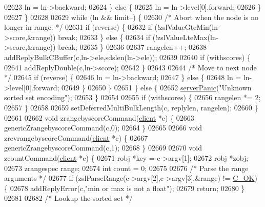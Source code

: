 \begin{DoxyCode}
02623                 ln = ln->backward;
02624             \} \textcolor{keywordflow}{else} \{
02625                 ln = ln->level[0].forward;
02626             \}
02627         \}
02628 
02629         \textcolor{keywordflow}{while} (ln && limit--) \{
02630             \textcolor{comment}{/* Abort when the node is no longer in range. */}
02631             \textcolor{keywordflow}{if} (reverse) \{
02632                 \textcolor{keywordflow}{if} (!zslValueGteMin(ln->score,&range)) \textcolor{keywordflow}{break};
02633             \} \textcolor{keywordflow}{else} \{
02634                 \textcolor{keywordflow}{if} (!zslValueLteMax(ln->score,&range)) \textcolor{keywordflow}{break};
02635             \}
02636 
02637             rangelen++;
02638             addReplyBulkCBuffer(c,ln->ele,sdslen(ln->ele));
02639 
02640             \textcolor{keywordflow}{if} (withscores) \{
02641                 addReplyDouble(c,ln->score);
02642             \}
02643 
02644             \textcolor{comment}{/* Move to next node */}
02645             \textcolor{keywordflow}{if} (reverse) \{
02646                 ln = ln->backward;
02647             \} \textcolor{keywordflow}{else} \{
02648                 ln = ln->level[0].forward;
02649             \}
02650         \}
02651     \} \textcolor{keywordflow}{else} \{
02652         \hyperlink{server_8h_a11cc378e7778a830b41240578de3b204}{serverPanic}(\textcolor{stringliteral}{"Unknown sorted set encoding"});
02653     \}
02654 
02655     \textcolor{keywordflow}{if} (withscores) \{
02656         rangelen *= 2;
02657     \}
02658 
02659     setDeferredMultiBulkLength(c, replylen, rangelen);
02660 \}
02661 
02662 \textcolor{keywordtype}{void} zrangebyscoreCommand(\hyperlink{structclient}{client} *c) \{
02663     genericZrangebyscoreCommand(c,0);
02664 \}
02665 
02666 \textcolor{keywordtype}{void} zrevrangebyscoreCommand(\hyperlink{structclient}{client} *c) \{
02667     genericZrangebyscoreCommand(c,1);
02668 \}
02669 
02670 \textcolor{keywordtype}{void} zcountCommand(\hyperlink{structclient}{client} *c) \{
02671     robj *key = c->argv[1];
02672     robj *zobj;
02673     zrangespec range;
02674     \textcolor{keywordtype}{int} count = 0;
02675 
02676     \textcolor{comment}{/* Parse the range arguments */}
02677     \textcolor{keywordflow}{if} (zslParseRange(c->argv[2],c->argv[3],&range) != \hyperlink{server_8h_a303769ef1065076e68731584e758d3e1}{C\_OK}) \{
02678         addReplyError(c,\textcolor{stringliteral}{"min or max is not a float"});
02679         \textcolor{keywordflow}{return};
02680     \}
02681 
02682     \textcolor{comment}{/* Lookup the sorted set */}

\end{DoxyCode}

